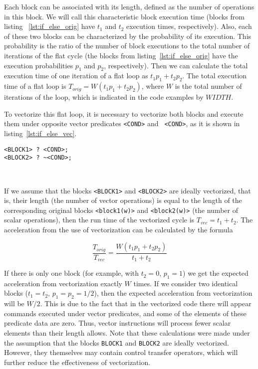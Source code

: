 \documentclass[
11pt,%
tightenlines,%
twoside,%
onecolumn,%
nofloats,%
nobibnotes,%
nofootinbib,%
superscriptaddress,%
noshowpacs,%
centertags]%
{revtex4}
\begin{document}
Each block can be associated with its length, defined as the number of operations in this block.
We will call this characteristic block execution time (blocks from listing ~\ref{lst:if_else_orig} have $t_1$ and $t_2$ execution times, respectively).
Also, each of these two blocks can be characterized by the probability of its execution.
This probability is the ratio of the number of block executions to the total number of iterations of the flat cycle (the blocks from listing~\ref{lst:if_else_orig} have the execution probabilities $p_1$ and $p_2$, respectively).
Then we can calculate the total execution time of one iteration of a flat loop as $t_1 p_1 + t_2 p_2$.
The total execution time of a flat loop is $T_ {orig} = W (t_1 p_1 + t_2 p_2)$, where $W$ is the total number of iterations of the loop, which is indicated in the code examples by $WIDTH$.

To vectorize this flat loop, it is necessary to vectorize both blocks and execute them under opposite vector predicates \texttt{<COND>} and \texttt{~<COND>}, as it is shown in listing~\ref{lst:if_else_vec}.

\begin{lstlisting}[caption={Vectorized construction \texttt{if-else}.},label={lst:if_else_vec}]
<BLOCK1> ? <COND>;
<BLOCK2> ? ~<COND>;
\end{lstlisting}

\

If we assume that the blocks \texttt{<BLOCK1>} and \texttt{<BLOCK2>} are ideally vectorized, that is, their length (the number of vector operations) is equal to the length of the corresponding original blocks \texttt{<block1(w)>} and \texttt{<block2(w)>} (the number of scalar operations), then the run time of the vectorized cycle is $T_{vec} = t_1 + t_2$.
The acceleration from the use of vectorization can be calculated by the formula

\begin{equation}
\frac{T_{orig}}{T_{vec}} = \frac{W(t_1 p_1 + t_2 p_2)}{t_1 + t_2}
\end{equation}

If there is only one block (for example, with $t_2 = 0$, $p_1 = 1$) we get the expected acceleration from vectorization exactly $W$ times.
If we consider two identical blocks ($t_1 = t_2$, $p_1 = p_2 = 1/2$), then the expected acceleration from vectorization will be $W / 2$.
This is due to the fact that in the vectorized code there will appear commands executed under vector predicates, and some of the elements of these predicate data are zero.
Thus, vector instructions will process fewer scalar elements than their length allows.
Note that these calculations were made under the assumption that the blocks \texttt{BLOCK1} and \texttt{BLOCK2} are ideally vectorized.
However, they themselves may contain control transfer operators, which will further reduce the effectiveness of vectorization.
\end{document}
